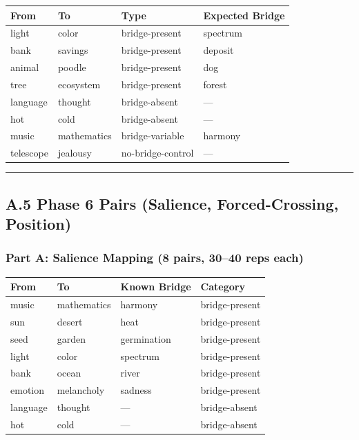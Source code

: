 \begin{longtable}[]{@{}llll@{}}
\toprule\noalign{}
From & To & Type & Expected Bridge \\
\midrule\noalign{}
\endhead
\bottomrule\noalign{}
\endlastfoot
light & color & bridge-present & spectrum \\
bank & savings & bridge-present & deposit \\
animal & poodle & bridge-present & dog \\
tree & ecosystem & bridge-present & forest \\
language & thought & bridge-absent & --- \\
hot & cold & bridge-absent & --- \\
music & mathematics & bridge-variable & harmony \\
telescope & jealousy & no-bridge-control & --- \\
\end{longtable}

\begin{center}\rule{0.5\linewidth}{0.5pt}\end{center}

\subsection{A.5 Phase 6 Pairs (Salience, Forced-Crossing, Position)}\label{a.5-phase-6-pairs-salience-forced-crossing-position}

\subsubsection{Part A: Salience Mapping (8 pairs, 30--40 reps each)}\label{part-a-salience-mapping-8-pairs-3040-reps-each}

\begin{longtable}[]{@{}llll@{}}
\toprule\noalign{}
From & To & Known Bridge & Category \\
\midrule\noalign{}
\endhead
\bottomrule\noalign{}
\endlastfoot
music & mathematics & harmony & bridge-present \\
sun & desert & heat & bridge-present \\
seed & garden & germination & bridge-present \\
light & color & spectrum & bridge-present \\
bank & ocean & river & bridge-present \\
emotion & melancholy & sadness & bridge-present \\
language & thought & --- & bridge-absent \\
hot & cold & --- & bridge-absent \\
\end{longtable}

